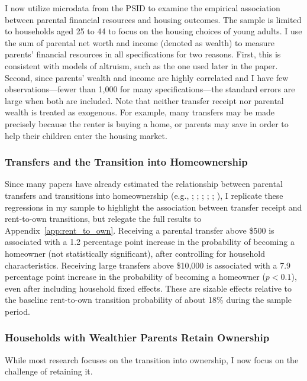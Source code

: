 \documentclass[12pt]{article}
\begin{document}
I now utilize microdata from the PSID to examine the empirical association between parental financial resources and housing outcomes. The sample is limited to households aged 25 to 44 to focus on the housing choices of young adults. I use the sum of parental net worth and income (denoted as wealth) to measure parents' financial resources in all specifications for two reasons. First, this is consistent with models of altruism, such as the one used later in the paper. Second, since parents' wealth and income are highly correlated and I have few observations---fewer than 1,000 for many specifications---the standard errors are large when both are included. Note that neither transfer receipt nor parental wealth is treated as exogenous. For example, many transfers may be made precisely because the renter is buying a home, or parents may save in order to help their children enter the housing market. 

\subsubsection{Transfers and the Transition into Homeownership}
Since many papers have already estimated the relationship between parental transfers and transitions into homeownership (e.g., \citealp{wold2024housing}; \citealp{Blickle2019}; \citealp{benetton2022dynastic}; \citealp{Lee2018}; \citealp{kurz2004labour}; \citealp{spilerman2012parental}), I replicate these regressions in my sample to highlight the association between transfer receipt and rent-to-own transitions, but relegate the full results to Appendix~\ref{app:rent_to_own}. Receiving a parental transfer above \$500 is associated with a 1.2 percentage point increase in the probability of becoming a homeowner (not statistically significant), after controlling for household characteristics. Receiving large transfers above \$10,000 is associated with a 7.9 percentage point increase in the probability of becoming a homeowner ($p<0.1$), even after including household fixed effects. These are sizable effects relative to the baseline rent-to-own transition probability of about 18\% during the sample period.


\subsubsection{Households with Wealthier Parents Retain Ownership}\label{sec:maintaining}
While most research focuses on the transition into ownership, I now focus on the challenge of retaining it.
\end{document}
